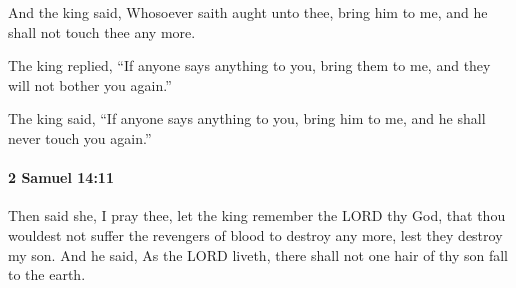 			\begin{versebox}
					\item[BHS] 
					\item[ASV] And the king said, Whosoever saith aught unto thee, bring him to me, and he shall not touch thee any more.
					\item[NIV] The king replied, “If anyone says anything to you, bring them to me, and they will not bother you again.”
					\item[NRSV] The king said, “If anyone says anything to you, bring him to me, and he shall never touch you again.”
			\end{versebox}

		\paragraph{2 Samuel 14:11} %
			\label{2SAMUEL-14-11}

			Then said she, I pray thee, let the king remember the LORD thy God, that thou wouldest not suffer the revengers of blood to destroy any more, lest they destroy my son. And he said, As the LORD liveth, there shall not one hair of thy son fall to the earth.

